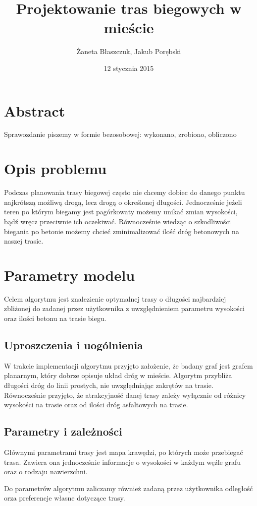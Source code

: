 \documentclass[12pt,a4paper]{article}
\author{Żaneta Błaszczuk, Jakub Porębski}
\title{Projektowanie tras biegowych w mieście}
\date{12 stycznia 2015}
\begin{document}

\tableofcontents
\newpage

\section{Abstract}
Sprawozdanie piszemy w formie bezosobowej: wykonano, zrobiono, obliczono



\section{Opis problemu}
Podczas planowania trasy biegowej często nie chcemy dobiec do danego punktu najkrótszą możliwą drogą, lecz drogą o określonej długości. Jednocześnie jeżeli teren po którym biegamy jest pagórkowaty możemy unikać zmian wysokości, bądź wręcz przeciwnie ich oczekiwać. Równocześnie wiedząc o szkodliwości biegania po betonie możemy chcieć zminimalizować ilość dróg betonowych na naszej trasie.

\section{Parametry modelu}
Celem algorytmu jest znalezienie optymalnej trasy o długości najbardziej zbliżonej do zadanej przez użytkownika z uwzględnieniem parametru wysokości oraz ilości betonu na trasie biegu.

\subsection{Uproszczenia i uogólnienia}
W trakcie implementacji algorytmu przyjęto założenie, że badany graf jest grafem planarnym, który dobrze opisuje układ dróg w mieście. Algorytm przybliża długości dróg do linii prostych, nie uwzględniając zakrętów na trasie.
Równocześnie przyjęto, że atrakcyjność danej trasy zależy wyłącznie od różnicy wysokości na trasie oraz od ilości dróg asfaltowych na trasie.

\subsection{Parametry i zależności}
Głównymi parametrami trasy jest mapa krawędzi, po których może przebiegać trasa. Zawiera ona jednocześnie informacje o wysokości w każdym węźle grafu oraz o rodzaju nawierzchni.

Do parametrów algorytmu zaliczamy również zadaną przez użytkownika odległość orza preferencje własne dotyczące trasy.
\end{document}
